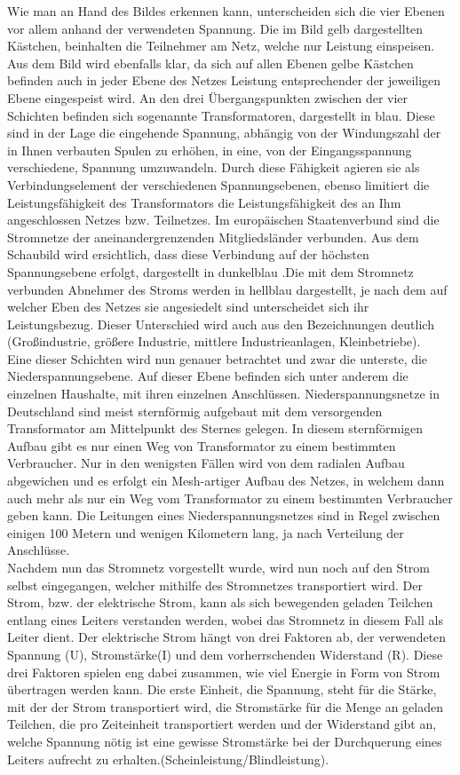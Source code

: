 Wie man an Hand des Bildes erkennen kann, unterscheiden sich die vier Ebenen vor allem anhand der verwendeten Spannung. Die im Bild gelb dargestellten Kästchen, beinhalten die Teilnehmer am Netz, welche nur Leistung einspeisen. Aus dem Bild wird ebenfalls klar, da sich auf allen Ebenen gelbe Kästchen befinden auch in jeder Ebene des Netzes Leistung entsprechender der jeweiligen Ebene eingespeist wird. An den drei Übergangspunkten zwischen der vier Schichten befinden sich sogenannte Transformatoren, dargestellt in blau. Diese sind in der Lage die eingehende Spannung, abhängig von der Windungszahl der in Ihnen verbauten Spulen zu erhöhen, in eine, von der Eingangsspannung verschiedene, Spannung umzuwandeln. Durch diese Fähigkeit agieren sie als Verbindungselement der verschiedenen Spannungsebenen, ebenso limitiert die Leistungsfähigkeit des Transformators die Leistungsfähigkeit des an Ihm angeschlossen Netzes bzw. Teilnetzes.
Im europäischen Staatenverbund sind die Stromnetze der aneinandergrenzenden Mitgliedsländer verbunden. Aus dem Schaubild wird ersichtlich, dass diese Verbindung auf der höchsten Spannungsebene erfolgt, dargestellt in dunkelblau .Die mit dem Stromnetz verbunden Abnehmer des Stroms werden in hellblau dargestellt, je nach dem auf welcher Eben des Netzes sie angesiedelt sind unterscheidet sich ihr Leistungsbezug. Dieser Unterschied wird auch aus den Bezeichnungen deutlich (Großindustrie, größere Industrie, mittlere Industrieanlagen, Kleinbetriebe). \\
Eine dieser Schichten wird nun genauer betrachtet und zwar die unterste, die Niederspannungsebene. Auf dieser Ebene befinden sich unter anderem die einzelnen Haushalte, mit ihren einzelnen Anschlüssen. Niederspannungsnetze in Deutschland sind meist sternförmig aufgebaut mit dem versorgenden Transformator am Mittelpunkt des Sternes gelegen. In diesem sternförmigen Aufbau gibt es nur einen Weg von Transformator zu einem bestimmten Verbraucher. Nur in den wenigsten Fällen wird von dem radialen Aufbau abgewichen und es erfolgt ein Mesh-artiger Aufbau des Netzes, in welchem dann auch mehr als nur ein Weg vom Transformator zu einem bestimmten Verbraucher geben kann. Die Leitungen eines Niederspannungsnetzes sind in Regel zwischen einigen 100 Metern und wenigen Kilometern lang, ja nach Verteilung der Anschlüsse. \\

Nachdem nun das Stromnetz vorgestellt wurde, wird nun noch auf den Strom selbst eingegangen, welcher mithilfe des Stromnetzes transportiert wird. Der Strom, bzw. der elektrische Strom, kann als sich bewegenden geladen Teilchen entlang eines Leiters verstanden werden, wobei das Stromnetz in diesem Fall als Leiter dient. Der elektrische Strom hängt von drei Faktoren ab, der verwendeten Spannung (U), Stromstärke(I) und dem vorherrschenden Widerstand (R). Diese drei Faktoren spielen eng dabei zusammen, wie viel Energie in Form von Strom übertragen werden kann. Die erste Einheit, die Spannung, steht für die Stärke, mit der der Strom transportiert wird, die Stromstärke für die Menge an geladen Teilchen, die pro Zeiteinheit transportiert werden und der Widerstand gibt an, welche Spannung nötig ist eine gewisse Stromstärke bei der Durchquerung eines Leiters aufrecht zu erhalten.(Scheinleistung/Blindleistung).

